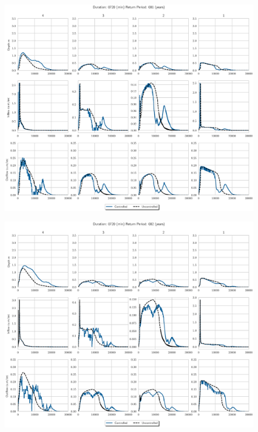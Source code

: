 \begin{figure}
    \centering
    \includegraphics[width=\linewidth]{./RL-SI-figures/77storms/0720001.eps}
\end{figure}
\begin{figure}
    \centering
    \includegraphics[width=\linewidth]{./RL-SI-figures/77storms/0720002.eps}
\end{figure}
